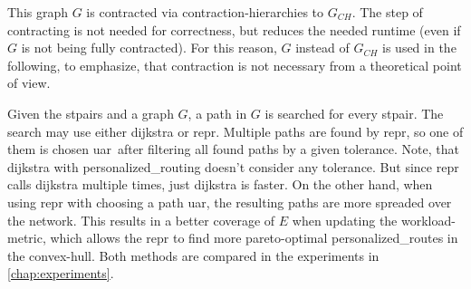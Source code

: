         This graph $G$ is contracted via \gls{contraction-hierarchies} to $G_{CH}$.
        The step of contracting is not needed for correctness, but reduces the needed runtime (even if $G$ is not being fully contracted).
        For this reason, $G$ instead of $G_{CH}$ is used in the following, to emphasize, that contraction is not necessary from a theoretical point of view.

        Given the \glspl{stpair} and a graph $G$, a path in $G$ is searched for every \gls{stpair}.
        The search may use either \gls{dijkstra} or \gls{repr}.
        Multiple paths are found by \gls{repr}, so one of them is chosen \gls{uar}\ after filtering all found paths by a given tolerance.
        Note, that \gls{dijkstra} with \gls{personalized_routing} doesn't consider any tolerance.
        But since \gls{repr} calls \gls{dijkstra} multiple times, just \gls{dijkstra} is faster.
        On the other hand, when using \gls{repr} with choosing a path \gls{uar}, the resulting paths are more spreaded over the network.
        This results in a better coverage of $E$ when updating the workload-\gls{metric}, which allows the \gls{repr} to find more pareto-optimal \glspl{personalized_route} in the convex-hull.
        Both methods are compared in the experiments in \vref{chap:experiments}.

